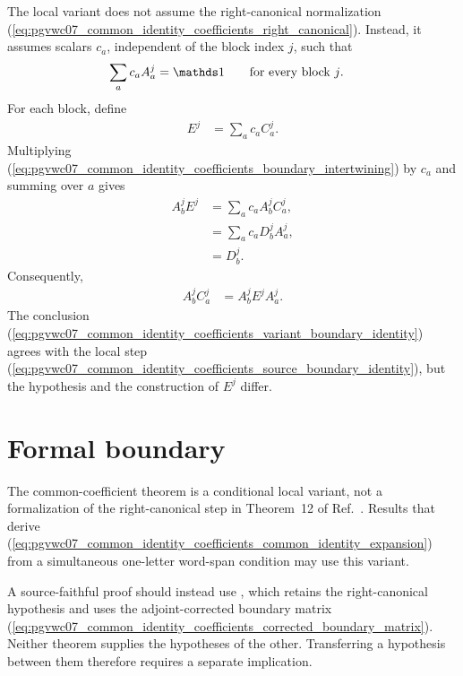 \documentclass{article}
\begin{document}
The local variant
does not assume the right-canonical normalization
(\ref{eq:pgvwc07_common_identity_coefficients_right_canonical}). Instead, it
assumes scalars $c_a$, independent of the block index $j$, such that
\begin{align}
    \sum_a c_a A_a^j
        &= \Id
        \qquad\text{for every block $j$.}
    \label{eq:pgvwc07_common_identity_coefficients_common_identity_expansion}
\end{align}
For each block, define
\begin{align}
    E^j
        &= \sum_a c_a C_a^j.
    \label{eq:pgvwc07_common_identity_coefficients_variant_boundary_matrix}
\end{align}
Multiplying
(\ref{eq:pgvwc07_common_identity_coefficients_boundary_intertwining}) by $c_a$
and summing over $a$ gives
\begin{align}
    A_b^j E^j
        &= \sum_a c_a A_b^j C_a^j,
    \label{eq:pgvwc07_common_identity_coefficients_weighted_boundary_sum}\\
        &= \sum_a c_a D_b^j A_a^j,
    \label{eq:pgvwc07_common_identity_coefficients_weighted_intertwining}\\
        &= D_b^j.
    \label{eq:pgvwc07_common_identity_coefficients_variant_factorization}
\end{align}
Consequently,
\begin{align}
    A_b^j C_a^j
        &= A_b^j E^j A_a^j.
    \label{eq:pgvwc07_common_identity_coefficients_variant_boundary_identity}
\end{align}
The conclusion
(\ref{eq:pgvwc07_common_identity_coefficients_variant_boundary_identity})
agrees with the local step
(\ref{eq:pgvwc07_common_identity_coefficients_source_boundary_identity}), but
the hypothesis and the construction of $E^j$ differ.

\section{Formal boundary}

The common-coefficient theorem is a conditional local variant, not a
formalization of the right-canonical step in Theorem~12 of
Ref.~\cite{PerezGarcia2007Matrix}. Results that derive
(\ref{eq:pgvwc07_common_identity_coefficients_common_identity_expansion}) from
a simultaneous one-letter word-span condition may use this variant.

A source-faithful proof should instead use
, which
retains the right-canonical hypothesis and uses the adjoint-corrected boundary
matrix
(\ref{eq:pgvwc07_common_identity_coefficients_corrected_boundary_matrix}).
Neither theorem supplies the hypotheses of the other. Transferring a
hypothesis between them therefore requires a separate implication.
\end{document}
